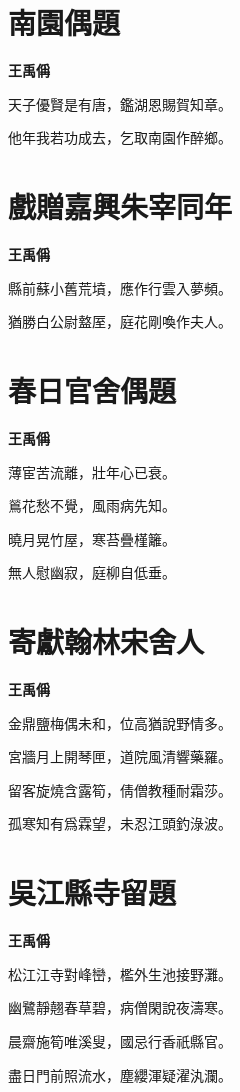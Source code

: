 \documentclass[12pt,a4paper]{ctexbook}
\begin{document}
\section{南園偶題}
\textbf{王禹偁}\par\vspace{0.5em}
天子優賢是有唐，鑑湖恩賜賀知章。\par
他年我若功成去，乞取南園作醉鄉。\par

\section{戲贈嘉興朱宰同年}
\textbf{王禹偁}\par\vspace{0.5em}
縣前蘇小舊荒墳，應作行雲入夢頻。\par
猶勝白公尉盩厔，庭花剛喚作夫人。\par

\section{春日官舍偶題}
\textbf{王禹偁}\par\vspace{0.5em}
薄宦苦流離，壯年心已衰。\par
鶑花愁不覺，風雨病先知。\par
曉月晃竹屋，寒苔疊槿籬。\par
無人慰幽寂，庭柳自低垂。\par

\section{寄獻翰林宋舍人}
\textbf{王禹偁}\par\vspace{0.5em}
金鼎鹽梅偶未和，位高猶說野情多。\par
宮牆月上開琴匣，道院風清響藥羅。\par
留客旋燒含露筍，倩僧教種耐霜莎。\par
孤寒知有爲霖望，未忍江頭釣淥波。\par

\section{吳江縣寺留題}
\textbf{王禹偁}\par\vspace{0.5em}
松江江寺對峰巒，檻外生池接野灘。\par
幽鷺靜翹春草碧，病僧閑說夜濤寒。\par
晨齋施筍唯溪叟，國忌行香祇縣官。\par
盡日門前照流水，塵纓渾疑濯汍瀾。\par
\end{document}
